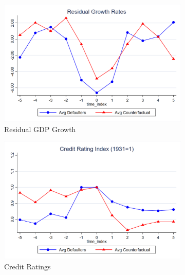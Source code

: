 \begin{figure}[ht!]
    \centering
    \begin{subfigure}[b]{0.48\textwidth}
        \centering
        \includegraphics[width=\textwidth]{figures/figc5_a.png}
        \caption{Residual GDP Growth}
        \label{fig:c5a}
    \end{subfigure}
    \hfill
    \begin{subfigure}[b]{0.48\textwidth}
        \centering
        \includegraphics[width=\textwidth]{figures/figc5_b.png}
        \caption{Credit Ratings}
        \label{fig:c5b}
    \end{subfigure}
    \\[1em]
    \begin{subfigure}[b]{0.48\textwidth}
        \centering

\end{subfigure}
\end{figure}
